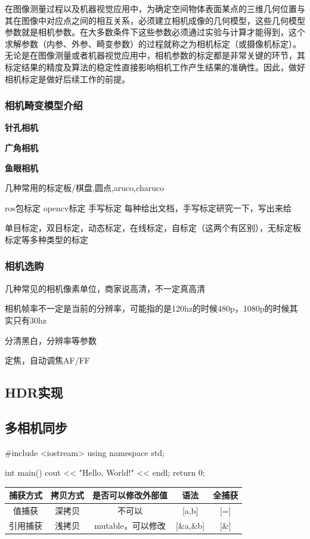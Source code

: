 在图像测量过程以及机器视觉应用中，为确定空间物体表面某点的三维几何位置与其在图像中对应点之间的相互关系，必须建立相机成像的几何模型，这些几何模型参数就是相机参数。在大多数条件下这些参数必须通过实验与计算才能得到，这个求解参数（内参、外参、畸变参数）的过程就称之为相机标定（或摄像机标定）。无论是在图像测量或者机器视觉应用中，相机参数的标定都是非常关键的环节，其标定结果的精度及算法的稳定性直接影响相机工作产生结果的准确性。因此，做好相机标定是做好后续工作的前提。

\subsubsection{相机畸变模型介绍}
\textbf{针孔相机}

\textbf{广角相机}

\textbf{鱼眼相机}





几种常用的标定板/棋盘,圆点,aruco,charuco

ros包标定 opencv标定 手写标定
每种给出文档，手写标定研究一下，写出来给

单目标定，双目标定，动态标定，在线标定，自标定（这两个有区别），无标定板标定等多种类型的标定


\subsubsection{相机选购}
几种常见的相机像素单位，商家说高清，不一定真高清

相机帧率不一定是当前的分辨率，可能指的是120hz的时候480p，1080p的时候其实只有30hz

分清黑白，分辨率等参数

定焦，自动调焦AF/FF

\subsection{HDR实现}
\subsection{多相机同步}


\begin{tcode}
#include <iostream>
using namespace std;

int main() {
    cout << "Hello, World!" << endl;
    return 0;
}
\end{tcode}

\begin{center}

        \begin{tabular}{ccccc}
            \hline
            捕获方式 & 拷贝方式 & 是否可以修改外部值 & 语法 & 全捕获\\
            \hline
            值捕获 & 深拷贝 & 不可以 & [a,b] & [=]\\
            引用捕获 & 浅拷贝 & mutable，可以修改 & [\&a,\&b] & [\&]\\
            \hline
            
        \end{tabular}
    \end{center}

